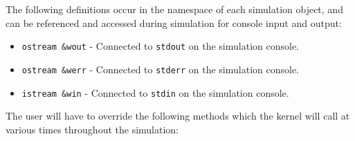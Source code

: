 \documentclass[11pt]{article}
\begin{document}
The following definitions occur in the namespace of each simulation
object, and can be referenced and accessed during simulation for console
input and output:

\begin{itemize}

\item{\tt ostream \&wout} - Connected to {\tt stdout} on the simulation
  console.

\item{\tt ostream \&werr} - Connected to {\tt stderr} on the simulation
  console.

\item{\tt istream \&win} -  Connected to {\tt stdin} on the simulation
  console.
\end{itemize}

The user will have to override the following methods which the kernel will
call at various times throughout the simulation:
\end{document}
